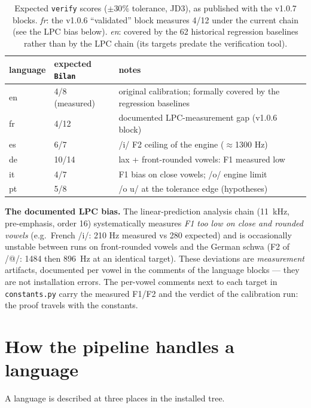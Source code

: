 \documentclass[11pt,a4paper]{article}
\newcommand{\code}[1]{\texttt{#1}}
\begin{document}
\begin{table}[htbp]
\centering
\caption{Expected \code{verify} scores ($\pm30\%$ tolerance, JD3),
as published with the v1.0.7 blocks. \emph{fr}: the v1.0.6
``validated'' block measures 4/12 under the current chain (see the
LPC bias below). \emph{en}: covered by the 62 historical regression
baselines rather than by the LPC chain (its targets predate the
verification tool).}
\label{tab:verdicts}
\begin{tabular}{lll}
\toprule
language & expected \code{Bilan} & notes \\
\midrule
en & 4/8 (measured) & original calibration; formally covered by the
regression baselines \\
fr & 4/12 & documented LPC-measurement gap (v1.0.6 block) \\
es & 6/7 & /i/ F2 ceiling of the engine ($\approx$1300 Hz) \\
de & 10/14 & lax + front-rounded vowels: F1 measured low \\
it & 4/7 & F1 bias on close vowels; /o/ engine limit \\
pt & 5/8 & /o u/ at the tolerance edge (hypotheses) \\
\bottomrule
\end{tabular}
\end{table}

\textbf{The documented LPC bias.} The linear-prediction analysis
chain (11~kHz, pre-emphasis, order 16) systematically measures
\emph{F1 too low on close and rounded vowels} (e.g.\ French /i/: 210
Hz measured vs 280 expected) and is occasionally unstable between
runs on front-rounded vowels and the German schwa (F2 of /@/: 1484
then 896~Hz at an identical target). These deviations are
\emph{measurement} artifacts, documented per vowel in the comments of
the language blocks --- they are not installation errors. The
per-vowel comments next to each target in \code{constants.py} carry
the measured F1/F2 and the verdict of the calibration run: the proof
travels with the constants.

\section{How the pipeline handles a language}
\label{sec:pipeline}

A language is described at three places in the installed tree.
\end{document}
